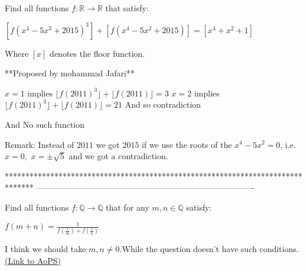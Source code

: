 \begin{solution}
	\begin{tcolorbox}Find all functions $f:\mathbb{R} \to \mathbb{R}$ that satisfy:

$[f(x^4-5x^2+2015)^3]+[f(x^4-5x^2+2015)]=[x^4+x^2+1]$

Where $[x]$ denotes the floor function.

**Proposed by mohammad Jafari**\end{tcolorbox}
$x=1$ implies $\lfloor f(2011)^3\rfloor+\lfloor f(2011)\rfloor=3$
$x=2$ implies $\lfloor f(2011)^3\rfloor+\lfloor f(2011)\rfloor=21$
And so contradiction

And $\boxed{\text{No such function}}$


\end{solution}



\begin{solution}
	Remark: Instead of $2011$ we got $2015$ if we use the roots of the $x^4-5x^2=0$, i.e. $x=0, $ $x=\pm\sqrt{5}$ and we got a contradiction.
\end{solution}
*******************************************************************************
-------------------------------------------------------------------------------

\begin{problem}
	Find all functions $f:\mathbb{Q} \to \mathbb{Q}$ that for any $m,n \in \mathbb{Q}$ satisfy:

$f(m+n)=\frac{1}{f(\frac{1}{m})+f(\frac{1}{n})}$

I think we should take $m,n \neq 0$.While the question doesn't have such conditions.
	\flushright \href{https://artofproblemsolving.com/community/c6h1574685}{(Link to AoPS)}
\end{problem}



